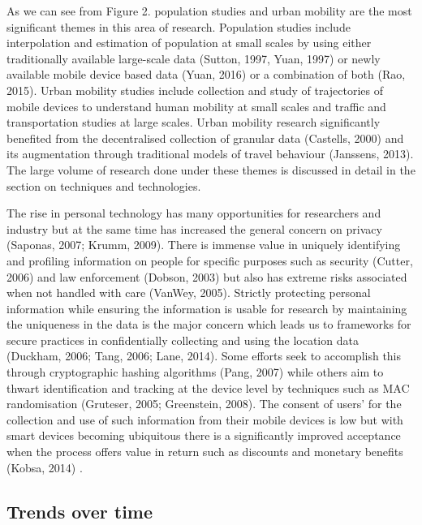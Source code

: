 As we can see from Figure 2. population studies and urban mobility are the most significant themes in this area of research.
Population studies include interpolation and estimation of population at small scales by using either traditionally available large-scale data (Sutton, 1997, Yuan, 1997) or newly available mobile device based data (Yuan, 2016) or a combination of both (Rao, 2015).
Urban mobility studies include collection and study of trajectories of mobile devices to understand human mobility at small scales and traffic and transportation studies at large scales.
Urban mobility research significantly benefited from the decentralised collection of granular data (Castells, 2000) and its augmentation through traditional models of travel behaviour (Janssens, 2013).
The large volume of research done under these themes is discussed in detail in the section on techniques and technologies.

The rise in personal technology has many opportunities for researchers and industry but at the same time has increased the general concern on privacy (Saponas, 2007; Krumm, 2009).
There is immense value in uniquely identifying and profiling information on people for specific purposes such as security (Cutter, 2006) and law enforcement (Dobson, 2003) but also has extreme risks associated when not handled with care (VanWey, 2005).
Strictly protecting personal information while ensuring the information is usable for research by maintaining the uniqueness in the data is the major concern which leads us to frameworks for secure practices in confidentially collecting and using the location data (Duckham, 2006; Tang, 2006; Lane, 2014).
Some efforts seek to accomplish this through cryptographic hashing algorithms (Pang, 2007) while others aim to thwart identification and tracking at the device level by techniques such as MAC randomisation (Gruteser, 2005; Greenstein, 2008).
The consent of users’ for the collection and use of such information from their mobile devices is low but with smart devices becoming ubiquitous there is a significantly improved acceptance when the process offers value in return such as discounts and monetary benefits (Kobsa, 2014) .

\subsection{Trends over time}

